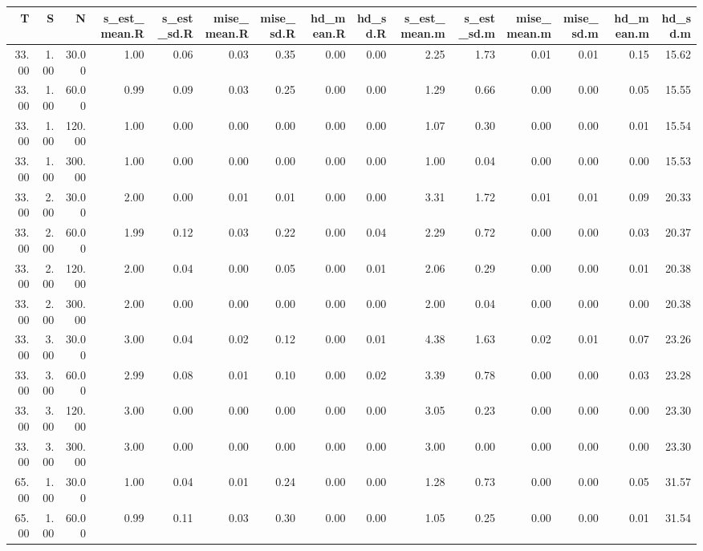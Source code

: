 \begin{table}[ht]
\centering
\begin{tabular}{rrrrrrrrrrrrrrr}
  \hline
T & S & N & s\_est\_mean.R & s\_est\_sd.R & mise\_mean.R & mise\_sd.R & hd\_mean.R & hd\_sd.R & s\_est\_mean.m & s\_est\_sd.m & mise\_mean.m & mise\_sd.m & hd\_mean.m & hd\_sd.m \\ 
  \hline
33.00 & 1.00 & 30.00 & 1.00 & 0.06 & 0.03 & 0.35 & 0.00 & 0.00 & 2.25 & 1.73 & 0.01 & 0.01 & 0.15 & 15.62 \\ 
  33.00 & 1.00 & 60.00 & 0.99 & 0.09 & 0.03 & 0.25 & 0.00 & 0.00 & 1.29 & 0.66 & 0.00 & 0.00 & 0.05 & 15.55 \\ 
  33.00 & 1.00 & 120.00 & 1.00 & 0.00 & 0.00 & 0.00 & 0.00 & 0.00 & 1.07 & 0.30 & 0.00 & 0.00 & 0.01 & 15.54 \\ 
  33.00 & 1.00 & 300.00 & 1.00 & 0.00 & 0.00 & 0.00 & 0.00 & 0.00 & 1.00 & 0.04 & 0.00 & 0.00 & 0.00 & 15.53 \\ 
  33.00 & 2.00 & 30.00 & 2.00 & 0.00 & 0.01 & 0.01 & 0.00 & 0.00 & 3.31 & 1.72 & 0.01 & 0.01 & 0.09 & 20.33 \\ 
  33.00 & 2.00 & 60.00 & 1.99 & 0.12 & 0.03 & 0.22 & 0.00 & 0.04 & 2.29 & 0.72 & 0.00 & 0.00 & 0.03 & 20.37 \\ 
  33.00 & 2.00 & 120.00 & 2.00 & 0.04 & 0.00 & 0.05 & 0.00 & 0.01 & 2.06 & 0.29 & 0.00 & 0.00 & 0.01 & 20.38 \\ 
  33.00 & 2.00 & 300.00 & 2.00 & 0.00 & 0.00 & 0.00 & 0.00 & 0.00 & 2.00 & 0.04 & 0.00 & 0.00 & 0.00 & 20.38 \\ 
  33.00 & 3.00 & 30.00 & 3.00 & 0.04 & 0.02 & 0.12 & 0.00 & 0.01 & 4.38 & 1.63 & 0.02 & 0.01 & 0.07 & 23.26 \\ 
  33.00 & 3.00 & 60.00 & 2.99 & 0.08 & 0.01 & 0.10 & 0.00 & 0.02 & 3.39 & 0.78 & 0.00 & 0.00 & 0.03 & 23.28 \\ 
  33.00 & 3.00 & 120.00 & 3.00 & 0.00 & 0.00 & 0.00 & 0.00 & 0.00 & 3.05 & 0.23 & 0.00 & 0.00 & 0.00 & 23.30 \\ 
  33.00 & 3.00 & 300.00 & 3.00 & 0.00 & 0.00 & 0.00 & 0.00 & 0.00 & 3.00 & 0.00 & 0.00 & 0.00 & 0.00 & 23.30 \\ 
  65.00 & 1.00 & 30.00 & 1.00 & 0.04 & 0.01 & 0.24 & 0.00 & 0.00 & 1.28 & 0.73 & 0.00 & 0.00 & 0.05 & 31.57 \\ 
  65.00 & 1.00 & 60.00 & 0.99 & 0.11 & 0.03 & 0.30 & 0.00 & 0.00 & 1.05 & 0.25 & 0.00 & 0.00 & 0.01 & 31.54 \\ 

\end{tabular}
\end{table}
